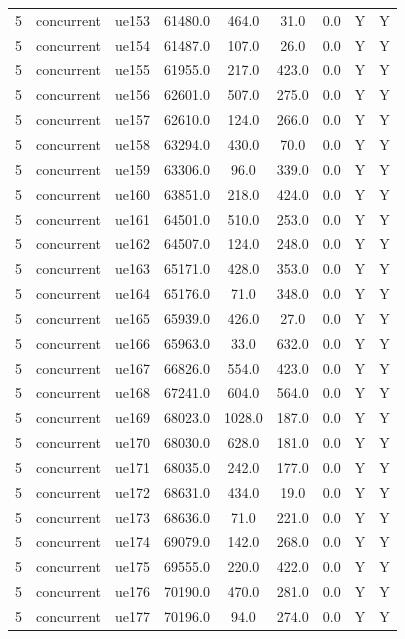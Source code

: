 \begin{table}[ht]
\begin{tabular}{|c|c|c|c|c|c|c|c|c|}
5 & concurrent & ue153 & 61480.0 & 464.0 & 31.0 & 0.0 & Y & Y \\
5 & concurrent & ue154 & 61487.0 & 107.0 & 26.0 & 0.0 & Y & Y \\
5 & concurrent & ue155 & 61955.0 & 217.0 & 423.0 & 0.0 & Y & Y \\
5 & concurrent & ue156 & 62601.0 & 507.0 & 275.0 & 0.0 & Y & Y \\
5 & concurrent & ue157 & 62610.0 & 124.0 & 266.0 & 0.0 & Y & Y \\
5 & concurrent & ue158 & 63294.0 & 430.0 & 70.0 & 0.0 & Y & Y \\
5 & concurrent & ue159 & 63306.0 & 96.0 & 339.0 & 0.0 & Y & Y \\
5 & concurrent & ue160 & 63851.0 & 218.0 & 424.0 & 0.0 & Y & Y \\
5 & concurrent & ue161 & 64501.0 & 510.0 & 253.0 & 0.0 & Y & Y \\
5 & concurrent & ue162 & 64507.0 & 124.0 & 248.0 & 0.0 & Y & Y \\
5 & concurrent & ue163 & 65171.0 & 428.0 & 353.0 & 0.0 & Y & Y \\
5 & concurrent & ue164 & 65176.0 & 71.0 & 348.0 & 0.0 & Y & Y \\
5 & concurrent & ue165 & 65939.0 & 426.0 & 27.0 & 0.0 & Y & Y \\
5 & concurrent & ue166 & 65963.0 & 33.0 & 632.0 & 0.0 & Y & Y \\
5 & concurrent & ue167 & 66826.0 & 554.0 & 423.0 & 0.0 & Y & Y \\
5 & concurrent & ue168 & 67241.0 & 604.0 & 564.0 & 0.0 & Y & Y \\
5 & concurrent & ue169 & 68023.0 & 1028.0 & 187.0 & 0.0 & Y & Y \\
5 & concurrent & ue170 & 68030.0 & 628.0 & 181.0 & 0.0 & Y & Y \\
5 & concurrent & ue171 & 68035.0 & 242.0 & 177.0 & 0.0 & Y & Y \\
5 & concurrent & ue172 & 68631.0 & 434.0 & 19.0 & 0.0 & Y & Y \\
5 & concurrent & ue173 & 68636.0 & 71.0 & 221.0 & 0.0 & Y & Y \\
5 & concurrent & ue174 & 69079.0 & 142.0 & 268.0 & 0.0 & Y & Y \\
5 & concurrent & ue175 & 69555.0 & 220.0 & 422.0 & 0.0 & Y & Y \\
5 & concurrent & ue176 & 70190.0 & 470.0 & 281.0 & 0.0 & Y & Y \\
5 & concurrent & ue177 & 70196.0 & 94.0 & 274.0 & 0.0 & Y & Y \\

\end{tabular}
\end{table}

